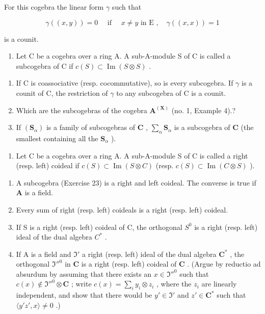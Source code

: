 For this cogebra the linear form \(\gamma\) such that

\[
\gamma ((x, y)) = 0 \quad \text { if } \quad x \neq y \text { in   E }, \quad \gamma ((x, x)) = 1
\]

is a counit.

\begin{enumerate}
\def\labelenumi{\arabic{enumi}.}
\setcounter{enumi}{22}
\tightlist
\item
  Let C be a cogebra over a ring A. A sub-A-module S of C is called a subcogebra of C if \(c(S) \subset \operatorname{Im}(S \otimes S)\) .
\end{enumerate}

\begin{enumerate}
\def\labelenumi{(\alph{enumi})}
\item
  If C is coassociative (resp. cocommutative), so is every subcogebra. If \(\gamma\) is a counit of C, the restriction of \(\gamma\) to any subcogebra of C is a counit.
\item
  Which are the subcogebras of the cogebra \(\mathbf{A}^{(\mathbf{X})}\) (no. 1, Example 4).?
\item
  If \((\mathbf{S}_{\alpha})\) is a family of subcogebras of \(\mathbf{C}\) , \(\sum_{\alpha} \mathbf{S}_{\alpha}\) is a subcogebra of \(\mathbf{C}\) (the smallest containing all the \(\mathbf{S}_{\alpha}\) ).
\end{enumerate}

\begin{enumerate}
\def\labelenumi{\arabic{enumi}.}
\setcounter{enumi}{23}
\tightlist
\item
  Let C be a cogebra over a ring A. A sub-A-module S of C is called a right (resp. left) coideal if \(c(S) \subset \operatorname{Im}(S \otimes C)\) (resp. \(c(S) \subset \operatorname{Im}(C \otimes S)\) ).
\end{enumerate}

\begin{enumerate}
\def\labelenumi{(\alph{enumi})}
\item
  A subcogebra (Exercise 23) is a right and left coideal. The converse is true if \(\mathbf{A}\) is a field.
\item
  Every sum of right (resp. left) coideals is a right (resp. left) coideal.
\item
  If S is a right (resp. left) coideal of C, the orthogonal \(S^{0}\) is a right (resp. left) ideal of the dual algebra \(C^{*}\) .
\item
  If A is a field and \(\mathfrak{I}'\) a right (resp. left) ideal of the dual algebra \(\mathbf{C}^*\) , the orthogonal \(\mathfrak{I}''^0\) in \(\mathbf{C}\) is a right (resp. left) coideal of \(\mathbf{C}\) . (Argue by reductio ad absurdum by assuming that there exists an \(x \in \mathfrak{I}''^0\) such that \(c(x) \notin \mathfrak{I}''^0 \otimes \mathbf{C}\) ; write \(c(x) = \sum_{i} y_i \otimes z_i\) , where the \(z_i\) are linearly independent, and show that there would be \(y' \in \mathfrak{I}'\) and \(z' \in \mathbf{C}^*\) such that \(\langle y' z', x \rangle \neq 0\) .)
\end{enumerate}


